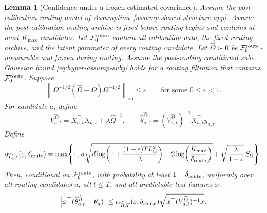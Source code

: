 \documentclass{article} %
\newtheorem{lemma}[theorem]{Lemma}
\begin{document}
\begin{lemma}[Confidence under a frozen estimated covariance]
\label{lem:confidence-under-frozen-omegahat-final}
Assume the post-calibration routing model of
Assumption~\ref{assump:shared-structure-app}.  Assume the post-calibration
routing archive is fixed before routing begins and contains at most
\(K_{\max}\) candidates. Let \(\mathcal F_0^{\rm route}\) contain all
calibration data, the fixed routing archive, and the latent parameter of every
routing candidate.
Let \(\widehat\Omega\succ0\) be
\(\mathcal F_0^{\rm route}\)-measurable and frozen during routing. Assume the
post-routing conditional sub-Gaussian bound
\eqref{eq:hyper-assump-subg} holds for a routing filtration that contains
\(\mathcal F_0^{\rm route}\). Suppose
\[
\left\|
\Omega^{-1/2}(\widehat\Omega-\Omega)\Omega^{-1/2}
\right\|_{\mathrm{op}}
\le \varepsilon
\qquad\text{for some }0\le\varepsilon<1.
\]
For candidate \(a\), define
\[
V_{a,t}^{\widehat\Omega}
=
X_{a,t}^\top X_{a,t}+\lambda\widehat\Omega^{-1},
\qquad
\widehat\theta_{a,t}^{\widehat\Omega}
=
(V_{a,t}^{\widehat\Omega})^{-1}X_{a,t}^\top y_{a,t}.
\]
Define
\[
\alpha_{\widehat\Omega,T}(\varepsilon,\delta_{\rm route})
=
\max\!\left\{
1,\,
\sigma
\sqrt{
d\log\!\left(1+\frac{(1+\varepsilon)TL_\Omega^2}{\lambda}\right)
+
2\log\!\left(\frac{K_{\max}}{\delta_{\rm route}}\right)
}
+
\sqrt{\frac{\lambda}{1-\varepsilon}}\,S_\Omega
\right\}.
\]
Then, conditional on \(\mathcal F_0^{\rm route}\), with probability at least
\(1-\delta_{\rm route}\), uniformly over all routing candidates \(a\), all
\(t\le T\), and all predictable test features \(x\),
\[
\left|
x^\top(\widehat\theta_{a,t}^{\widehat\Omega}-\theta_a)
\right|
\le
\alpha_{\widehat\Omega,T}(\varepsilon,\delta_{\rm route})
\sqrt{x^\top(V_{a,t}^{\widehat\Omega})^{-1}x}.
\]
\end{lemma}
\end{document}
